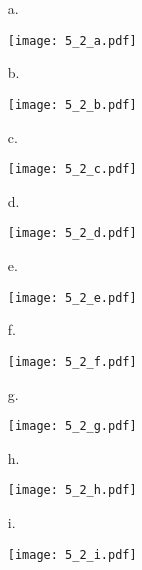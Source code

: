 \documentclass[11pt, oneside]{article}
\begin{document}
{
  \begin{enumerate}
    \item[a.] 
      \begin{minipage}{\linewidth}
        \centering
        \texttt{[image: 5\_2\_a.pdf]}
      \end{minipage}
    \item[b.] 
      \begin{minipage}{\linewidth}
        \centering
        \texttt{[image: 5\_2\_b.pdf]}
      \end{minipage}
    \item[c.]
      \begin{minipage}{\linewidth}
        \centering
        \texttt{[image: 5\_2\_c.pdf]}
      \end{minipage}
    \item[d.]
      \begin{minipage}{\linewidth}
        \centering
        \texttt{[image: 5\_2\_d.pdf]}
      \end{minipage}
    \item[e.]
      \begin{minipage}{\linewidth}
        \centering
        \texttt{[image: 5\_2\_e.pdf]}
      \end{minipage}
    \item[f.]
      \begin{minipage}{\linewidth}
        \centering
        \texttt{[image: 5\_2\_f.pdf]}
      \end{minipage}
    \item[g.]
      \begin{minipage}{\linewidth}
        \centering
        \texttt{[image: 5\_2\_g.pdf]}
      \end{minipage}
    \item[h.]
      \begin{minipage}{\linewidth}
        \centering
        \texttt{[image: 5\_2\_h.pdf]}
      \end{minipage}
    \item[i.]
      \begin{minipage}{\linewidth}
        \centering
        \texttt{[image: 5\_2\_i.pdf]}

\end{minipage}
\end{enumerate}}
\end{document}
